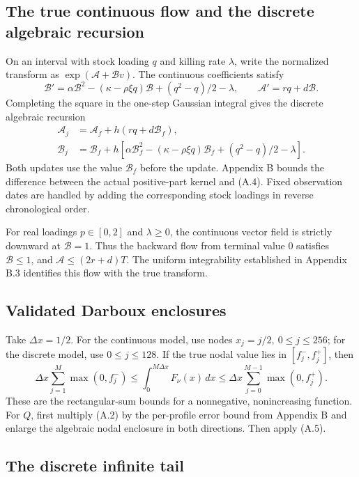 \subsection{The true continuous flow and the discrete algebraic recursion}

On an interval with stock loading \(q\) and killing rate \(\lambda\), write the normalized transform as \(\exp(\mathcal A+\mathcal Bv)\). The continuous coefficients satisfy
\[
\mathcal B'=\alpha\mathcal B^2-(\kappa-\rho\xi q)\mathcal B+
(q^2-q)/2-\lambda,\qquad
\mathcal A'=rq+d\mathcal B.
\tag{A.3}
\]
Completing the square in the one-step Gaussian integral gives the discrete algebraic recursion
\[
\begin{aligned}
\mathcal A_j&=\mathcal A_f+h(rq+d\mathcal B_f),\\
\mathcal B_j&=\mathcal B_f+h\left[
\alpha\mathcal B_f^2-(\kappa-\rho\xi q)\mathcal B_f+
(q^2-q)/2-\lambda\right].
\end{aligned}
\tag{A.4}
\]
Both updates use the value \(\mathcal B_f\) before the update. Appendix B bounds the difference between the actual positive-part kernel and (A.4). Fixed observation dates are handled by adding the corresponding stock loadings in reverse chronological order.

For real loadings \(p\in[0,2]\) and \(\lambda\ge0\), the continuous vector field is strictly downward at \(\mathcal B=1\). Thus the backward flow from terminal value 0 satisfies \(\mathcal B\le1\), and \(\mathcal A\le(2r+d)T\). The uniform integrability established in Appendix B.3 identifies this flow with the true transform.

\subsection{Validated Darboux enclosures}

Take \(\Delta x=1/2\). For the continuous model, use nodes \(x_j=j/2,\ 0\le j\le256\); for the discrete model, use \(0\le j\le128\). If the true nodal value lies in \([f_j^-,f_j^+]\), then
\[
\Delta x\sum_{j=1}^{M}\max(0,f_j^-)
\le\int_0^{M\Delta x}F_\nu(x)\,dx
\le\Delta x\sum_{j=0}^{M-1}\max(0,f_j^+).
\tag{A.5}
\]
These are the rectangular-sum bounds for a nonnegative, nonincreasing function. For \(Q\), first multiply (A.2) by the per-profile error bound from Appendix B and enlarge the algebraic nodal enclosure in both directions. Then apply (A.5).

\subsection{The discrete infinite tail}

